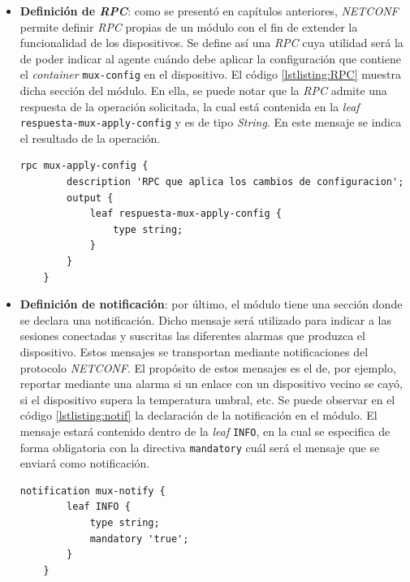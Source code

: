 \begin{itemize}
    \item \textbf{Definición de \textit{RPC}}: como se presentó en capítulos anteriores, \textit{NETCONF} permite definir \textit{RPC} propias de un módulo con el fin de extender la funcionalidad de los dispositivos. Se define así una \textit{RPC} cuya utilidad será la de poder indicar al agente cuándo debe aplicar la configuración que contiene el \textit{container} \texttt{mux-config} en el dispositivo. El código \ref{lstlisting:RPC} muestra dicha sección del módulo. En ella, se puede notar que la \textit{RPC} admite una respuesta de la operación solicitada, la cual está contenida en la \textit{leaf} \texttt{respuesta-mux-apply-config} y es de tipo \textit{String}. En este mensaje se indica el resultado de la operación.

    

    \begin{lstlisting}[language=SHELXL, caption=Declaración de \textit{RPC}., label=lstlisting:RPC]
    rpc mux-apply-config {        
        description 'RPC que aplica los cambios de configuracion';
        output {
            leaf respuesta-mux-apply-config {
                type string;
            }
        }
    }
    \end{lstlisting}

    \item \textbf{Definición de notificación}: por último, el módulo tiene una sección donde se declara una notificación. Dicho mensaje será utilizado para indicar a las sesiones conectadas y suscritas las diferentes alarmas que produzca el dispositivo. Estos mensajes se transportan mediante notificaciones del protocolo \textit{NETCONF}. El propósito de estos mensajes es el de, por ejemplo, reportar mediante una alarma si un enlace con un dispositivo vecino se cayó, si el dispositivo supera la temperatura umbral, etc. Se puede observar en el código \ref{lstlisting:notif} la declaración de la notificación en el módulo. El mensaje estará contenido dentro de la \textit{leaf} \texttt{INFO}, en la cual se especifica de forma obligatoria con la directiva \texttt{mandatory} cuál será el mensaje que se enviará como notificación.

    \begin{lstlisting}[language=SHELXL, caption=Declaración de notificación., label=lstlisting:notif]
    notification mux-notify {
        leaf INFO {
            type string;
            mandatory 'true';
        }
    }
    \end{lstlisting}

\end{itemize}

